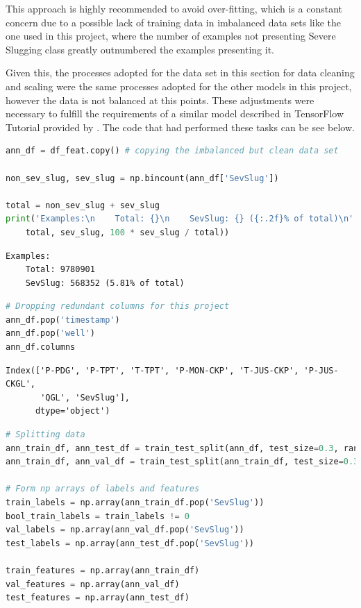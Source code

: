 \documentclass{article}
\begin{document}
This approach is highly recommended to avoid over-fitting, which is a constant concern due to a possible lack of training data in imbalanced data sets \parencite{tensorflow2015-whitepaper} like the one used in this project, where the number of examples not presenting Severe Slugging class greatly outnumbered the examples presenting it.

Given this, the processes adopted for the data set in this section for data cleaning and scaling were the same processes adopted for the other models in this project, however the data is not balanced at this points. These adjustments were necessary to fulfill the requirements of a similar model described in TensorFlow Tutorial provided by \textcite{tensorflow2015-whitepaper}. The code that had performed these tasks can be see below. 

\begin{lstlisting}[language=Python]
ann_df = df_feat.copy() # copying the imbalanced but clean data set

non_sev_slug, sev_slug = np.bincount(ann_df['SevSlug'])

total = non_sev_slug + sev_slug
print('Examples:\n    Total: {}\n    SevSlug: {} ({:.2f}% of total)\n'.format(
    total, sev_slug, 100 * sev_slug / total))
\end{lstlisting}
\begin{verbatim}
Examples:
    Total: 9780901
    SevSlug: 568352 (5.81% of total)
\end{verbatim}

\begin{lstlisting}[language=Python]
# Dropping redundant columns for this project
ann_df.pop('timestamp')
ann_df.pop('well')
ann_df.columns
\end{lstlisting}
\begin{verbatim}
Index(['P-PDG', 'P-TPT', 'T-TPT', 'P-MON-CKP', 'T-JUS-CKP', 'P-JUS-CKGL',
       'QGL', 'SevSlug'],
      dtype='object')
\end{verbatim}

\begin{lstlisting}[language=Python]
# Splitting data
ann_train_df, ann_test_df = train_test_split(ann_df, test_size=0.3, random_state=42)
ann_train_df, ann_val_df = train_test_split(ann_train_df, test_size=0.3)

# Form np arrays of labels and features
train_labels = np.array(ann_train_df.pop('SevSlug'))
bool_train_labels = train_labels != 0
val_labels = np.array(ann_val_df.pop('SevSlug'))
test_labels = np.array(ann_test_df.pop('SevSlug'))

train_features = np.array(ann_train_df)
val_features = np.array(ann_val_df)
test_features = np.array(ann_test_df)
\end{lstlisting}
\end{document}
